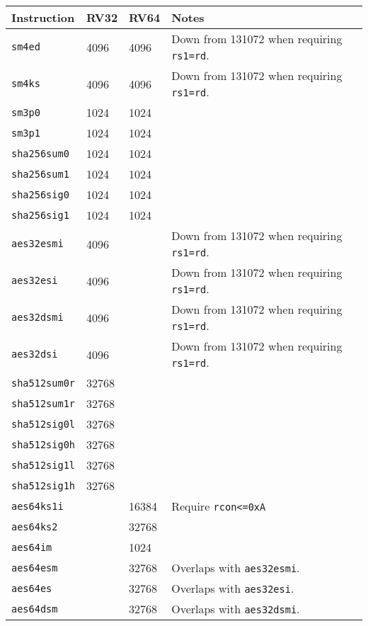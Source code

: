 \begin{table}[]
\centering
\begin{tabular}{@{}llll@{}}
\toprule
Instruction      & RV32   & RV64   & Notes \\ \midrule
{\tt       sm4ed}& 4096   & 4096   & Down from 131072 when requiring {\tt rs1=rd}. \\
{\tt       sm4ks}& 4096   & 4096   & Down from 131072 when requiring {\tt rs1=rd}. \\
{\tt       sm3p0}& 1024   & 1024   &           \\
{\tt       sm3p1}& 1024   & 1024   &           \\
{\tt  sha256sum0}& 1024   & 1024   &           \\
{\tt  sha256sum1}& 1024   & 1024   &           \\
{\tt  sha256sig0}& 1024   & 1024   &           \\
{\tt  sha256sig1}& 1024   & 1024   &           \\
{\tt   aes32esmi}& 4096   &        & Down from 131072 when requiring {\tt rs1=rd}. \\
{\tt    aes32esi}& 4096   &        & Down from 131072 when requiring {\tt rs1=rd}. \\
{\tt   aes32dsmi}& 4096   &        & Down from 131072 when requiring {\tt rs1=rd}. \\
{\tt    aes32dsi}& 4096   &        & Down from 131072 when requiring {\tt rs1=rd}. \\
{\tt sha512sum0r}& 32768  &        &           \\
{\tt sha512sum1r}& 32768  &        &           \\
{\tt sha512sig0l}& 32768  &        &           \\
{\tt sha512sig0h}& 32768  &        &           \\
{\tt sha512sig1l}& 32768  &        &           \\
{\tt sha512sig1h}& 32768  &        &           \\
{\tt   aes64ks1i}&        & 16384  & Require {\tt rcon<=0xA}    \\
{\tt    aes64ks2}&        & 32768  &           \\
{\tt     aes64im}&        & 1024   &            \\
{\tt    aes64esm}&        & 32768  & Overlaps with {\tt aes32esmi}.\\
{\tt     aes64es}&        & 32768  & Overlaps with {\tt aes32esi}.\\
{\tt    aes64dsm}&        & 32768  & Overlaps with {\tt aes32dsmi}.\\

\end{tabular}
\end{table}

